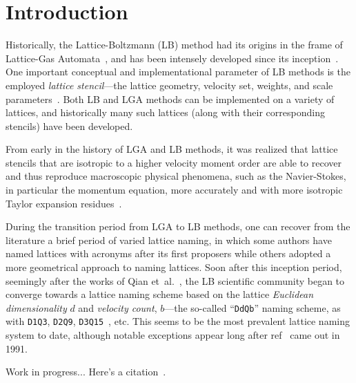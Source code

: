 \section{Introduction}

    Historically,   the   Lattice-Boltzmann   (LB)    method    had    its    origins    in    the    frame    of    Lattice-Gas
    Automata~\cite{1988-McNamaraGR+ZanettiG-PhysRevLett},     and     has     been     intensely     developed     since     its
    inception~\cite{2018-KrugerT+ViggenEM-Springer}. One important conceptual and implementational parameter of  LB  methods  is
    the    employed    \emph{lattice    stencil}---the    lattice    geometry,    velocity    set,    weights,     and     scale
    parameters~\cite{2013-HegeleJr+PhilippiPC-JSciComput,                                2013-MattilaKK+PhilippiPC-IntJModPhysC,
    2014-MattilaKK+PhilippiPC-SciWorldJ}. Both LB and LGA methods can be implemented on a variety of lattices, and  historically
    many such lattices (along with their corresponding stencils) have been developed.

    From early in the history of LGA and LB methods, it was realized that lattice  stencils  that  are  isotropic  to  a  higher
    velocity moment order are able to recover and thus reproduce macroscopic physical phenomena, such as the  Navier-Stokes,  in
    particular    the    momentum    equation,    more    accurately    and    with    more    isotropic    Taylor     expansion
    residues~\cite{1986-WolframS-JStatPhys}.

    During the transition period from LGA to LB methods, one can recover from the literature a brief period  of  varied  lattice
    naming, in which some authors have named lattices with acronyms after its  first  proposers  while  others  adopted  a  more
    geometrical  approach  to  naming  lattices.  Soon  after  this  inception  period,  seemingly  after  the  works  of   Qian
    et~al.~\cite{1991-QianYH+LallemandP-AdvKinTheoContMech, 1992-QianYH+LallemandP-EurophysLett}, the  LB  scientific  community
    began to  converge  towards  a  lattice  naming  scheme  based  on  the  lattice  \emph{Euclidean  dimensionality}  $d$  and
    \emph{velocity  count},  $b$---the  so-called  ``\texttt{DdQb}''  naming  scheme,  as  with  \texttt{D1Q3},   \texttt{D2Q9},
    \texttt{D3Q15}~\cite{1992-QianYH+LallemandP-EurophysLett}, etc. This seems to be the most prevalent lattice naming system to
    date, although notable exceptions appear long after ref~\cite{1991-QianYH+LallemandP-AdvKinTheoContMech} came out in 1991.

    Work in progress... Here's a citation~\cite{2016-PhilippiPC+MattilaKK-JBrazSocMechSci}.

